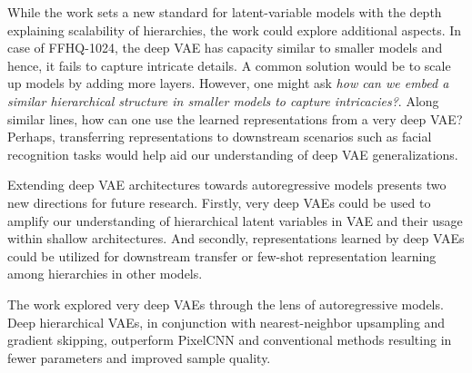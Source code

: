 \documentclass[11pt,letterpaper]{article}
\begin{document}
While the work sets a new standard for latent-variable models with the depth explaining scalability of hierarchies, the work could explore additional aspects. In case of FFHQ-1024, the deep VAE has capacity similar to smaller models and hence, it fails to capture intricate details. A common solution would be to scale up models by adding more layers. However, one might ask \textit{how can we embed a similar hierarchical structure in smaller models to capture intricacies?}. Along similar lines, how can one use the learned representations from a very deep VAE? Perhaps, transferring representations to downstream scenarios such as facial recognition tasks would help aid our understanding of deep VAE generalizations. 

Extending deep VAE architectures towards autoregressive models presents two new directions for future research. Firstly, very deep VAEs could be used to amplify our understanding of hierarchical latent variables in VAE and their usage within shallow architectures. And secondly, representations learned by deep VAEs could be utilized for downstream transfer or few-shot representation learning among hierarchies in other models. 

The work explored very deep VAEs through the lens of autoregressive models. Deep hierarchical VAEs, in conjunction with nearest-neighbor upsampling and gradient skipping, outperform PixelCNN and conventional methods resulting in fewer parameters and improved sample quality. 
\end{document}
